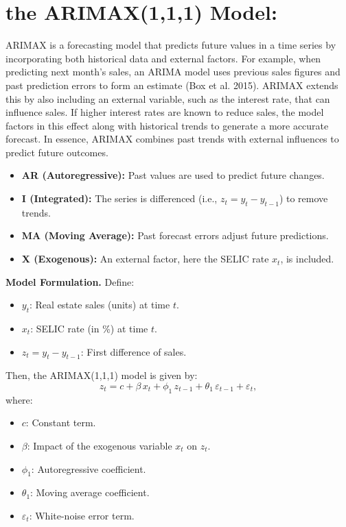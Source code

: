 \documentclass{article}
\begin{document}
\section{ the ARIMAX(1,1,1) Model:}
\label{sec:arimax}

ARIMAX is a forecasting model that predicts future values in a time series by incorporating both historical data and external factors. For example, when predicting next month’s sales, an ARIMA model uses previous sales figures and past prediction errors to form an estimate (Box et al. 2015). ARIMAX extends this by also including an external variable, such as the interest rate, that can influence sales. If higher interest rates are known to reduce sales, the model factors in this effect along with historical trends to generate a more accurate forecast. In essence, ARIMAX combines past trends with external influences to predict future outcomes.
\begin{itemize}
    \item \textbf{AR (Autoregressive):} Past values are used to predict future changes.
    \item \textbf{I (Integrated):} The series is differenced (i.e., \(z_t = y_t - y_{t-1}\)) to remove trends.
    \item \textbf{MA (Moving Average):} Past forecast errors adjust future predictions.
    \item \textbf{X (Exogenous):} An external factor, here the SELIC rate \(x_t\), is included.
\end{itemize}

\textbf{Model Formulation.}  
Define:
\begin{itemize}
    \item \(y_t\): Real estate sales (units) at time \(t\).
    \item \(x_t\): SELIC rate (in \%) at time \(t\).
    \item \(z_t = y_t - y_{t-1}\): First difference of sales.
\end{itemize}
Then, the ARIMAX(1,1,1) model is given by:
\begin{equation}
z_t = c + \beta\,x_t + \phi_1\,z_{t-1} + \theta_1\,\varepsilon_{t-1} + \varepsilon_t,
\end{equation}
where:
\begin{itemize}
    \item \(c\): Constant term.
    \item \(\beta\): Impact of the exogenous variable \(x_t\) on \(z_t\).
    \item \(\phi_1\): Autoregressive coefficient.
    \item \(\theta_1\): Moving average coefficient.
    \item \(\varepsilon_t\): White-noise error term.
\end{itemize}
\end{document}
